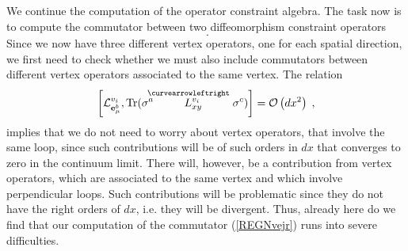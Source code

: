 \documentclass[12pt]{article}
\newcommand{\nn}{\nonumber}
\def\m{\mu}
\def\cl{{\cal L}}
\def\co{{\cal O}}
\begin{document}
\begin{appendix}
We continue the computation of the operator constraint algebra. The task now is to compute the commutator between two diffeomorphism constraint operators
\begin{equation}
[\mathds{D}_n(\bar{N}),\mathds{D}_n(\bar{N}')]\;.
\label{REGNvejr}
\end{equation}
Since we now have three different vertex operators, one for each spatial direction, we first need to check whether we must also include commutators between different vertex operators associated to the same vertex. The relation
\begin{equation}
 \left[  \cl^{v_i}_{{\bf e}^b_\m} ,  \mbox{Tr} (  \sigma^a    \stackrel{\hspace{-3mm}\curvearrowleftright}{L^{v_{i}}_{xy}}       \sigma^c   )     \right]  
 =  \co\left(dx^2\right) \;,
\nn
\end{equation}
implies that we do not need to worry about vertex operators, that involve the same loop, since such contributions will be of such orders in $dx$ that converges to zero in the continuum limit. There will, however, be a contribution from vertex operators, which are associated to the same vertex and which involve perpendicular loops. Such contributions will be problematic since they do not have the right orders of $dx$, i.e. they will be divergent. Thus, already here do we find that our computation of the commutator (\ref{REGNvejr}) runs into severe difficulties. 





\end{appendix}
\end{document}
